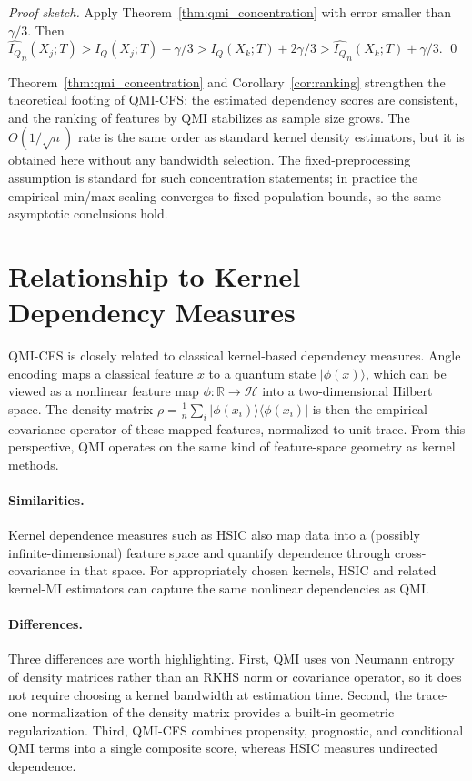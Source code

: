 \documentclass{svproc}
\newcommand{\QMI}{I_Q}
\begin{document}
\textit{Proof sketch.} Apply Theorem~\ref{thm:qmi_concentration} with error smaller than $\gamma/3$. Then $\widehat{\QMI}_n(X_j; T) > \QMI(X_j; T) - \gamma/3 > \QMI(X_k; T) + 2\gamma/3 > \widehat{\QMI}_n(X_k; T) + \gamma/3$. \qed

Theorem~\ref{thm:qmi_concentration} and Corollary~\ref{cor:ranking} strengthen the theoretical footing of QMI-CFS: the estimated dependency scores are consistent, and the ranking of features by QMI stabilizes as sample size grows. The $O(1/\sqrt{n})$ rate is the same order as standard kernel density estimators, but it is obtained here without any bandwidth selection. The fixed-preprocessing assumption is standard for such concentration statements; in practice the empirical min/max scaling converges to fixed population bounds, so the same asymptotic conclusions hold.

\section{Relationship to Kernel Dependency Measures}
\label{sec:kernel}

QMI-CFS is closely related to classical kernel-based dependency measures. Angle encoding maps a classical feature $x$ to a quantum state $|\phi(x)\rangle$, which can be viewed as a nonlinear feature map $\phi: \mathbb{R} \to \mathcal{H}$ into a two-dimensional Hilbert space. The density matrix $\rho = \frac{1}{n}\sum_i |\phi(x_i)\rangle\langle\phi(x_i)|$ is then the empirical covariance operator of these mapped features, normalized to unit trace. From this perspective, QMI operates on the same kind of feature-space geometry as kernel methods.

\paragraph{Similarities.} Kernel dependence measures such as HSIC \cite{gretton2005measuring,gretton2007kernel} also map data into a (possibly infinite-dimensional) feature space and quantify dependence through cross-covariance in that space. For appropriately chosen kernels, HSIC and related kernel-MI estimators can capture the same nonlinear dependencies as QMI.

\paragraph{Differences.} Three differences are worth highlighting. First, QMI uses von Neumann entropy of density matrices rather than an RKHS norm or covariance operator, so it does not require choosing a kernel bandwidth at estimation time. Second, the trace-one normalization of the density matrix provides a built-in geometric regularization. Third, QMI-CFS combines propensity, prognostic, and conditional QMI terms into a single composite score, whereas HSIC measures undirected dependence.
\end{document}
